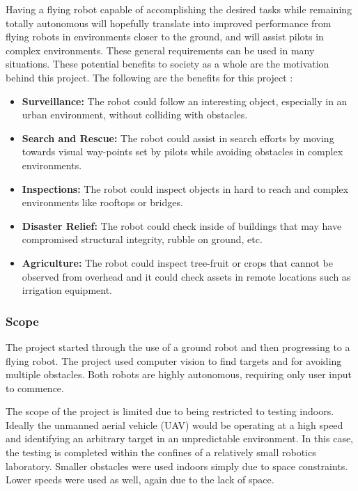 \documentclass{article}[12]
\begin{document}
		Having a flying robot capable of accomplishing the desired tasks while remaining totally autonomous will hopefully translate into improved performance from flying robots in environments closer to the ground, and will assist pilots in complex environments. These general requirements can be used in many situations. These potential benefits to society as a whole are the motivation behind this project. The following are the benefits for this project :
		\begin{itemize}
			\item \textbf{Surveillance:} The robot could follow an interesting object, especially in an urban environment, without colliding with obstacles.
			\item \textbf{Search and Rescue:} The robot could assist in search efforts by moving towards visual way-points set by pilots while avoiding obstacles in complex environments.
			\item \textbf{Inspections:} The robot could inspect objects in hard to reach and complex environments like rooftops or bridges.
			\item \textbf{Disaster Relief:} The robot could check inside of buildings that may have compromised structural integrity, rubble on ground, etc.
			\item \textbf{Agriculture:} The robot could inspect tree-fruit or crops that cannot be observed from overhead and it could check assets in remote locations such as irrigation equipment.
		\end{itemize}

		\subsubsection{Scope}
	
		The project started through the use of a ground robot and then progressing to a flying robot. The project used computer vision to find targets and for avoiding multiple obstacles. Both robots are highly autonomous, requiring only user input to commence. 

		The scope of the project is limited due to being restricted to testing indoors. Ideally the unmanned aerial vehicle (UAV) would be operating at a high speed and identifying an arbitrary target in an unpredictable environment. In this case, the testing is completed within the confines of a relatively small robotics laboratory. Smaller obstacles were used indoors simply due to space constraints. Lower speeds were used as well, again due to the lack of space. 
\end{document}
